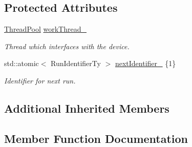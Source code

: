 \subsection*{Protected Attributes}
\begin{DoxyCompactItemize}
\item 
\mbox{\label{classglow_1_1runtime_1_1_queue_backed_device_manager_add4b225c593e86e32aede5170316b5c0}} 
\hyperlink{classglow_1_1_thread_pool}{Thread\+Pool} \hyperlink{classglow_1_1runtime_1_1_queue_backed_device_manager_add4b225c593e86e32aede5170316b5c0}{work\+Thread\+\_\+}
\begin{DoxyCompactList}\small\item\em Thread which interfaces with the device. \end{DoxyCompactList}\item 
\mbox{\label{classglow_1_1runtime_1_1_queue_backed_device_manager_a804cc750ff8a547227c51fe08956487e}} 
std\+::atomic$<$ Run\+Identifier\+Ty $>$ \hyperlink{classglow_1_1runtime_1_1_queue_backed_device_manager_a804cc750ff8a547227c51fe08956487e}{next\+Identifier\+\_\+} \{1\}
\begin{DoxyCompactList}\small\item\em Identifier for next run. \end{DoxyCompactList}\end{DoxyCompactItemize}
\subsection*{Additional Inherited Members}


\subsection{Member Function Documentation}
\mbox{\label{classglow_1_1runtime_1_1_queue_backed_device_manager_a70b2d1886841e1c223e6813e218545f5}} 
